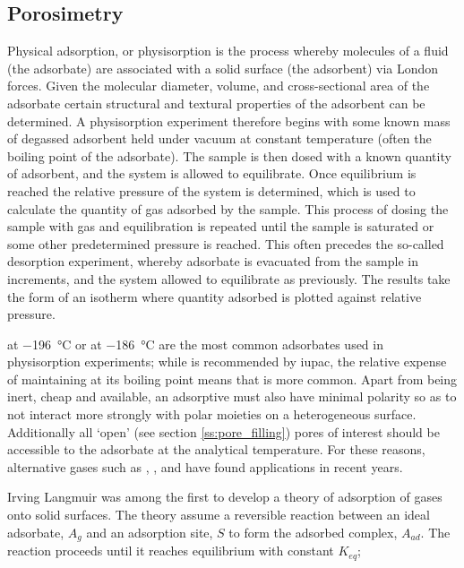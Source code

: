 \subsection{Porosimetry}\label{ss:porosimetry}

Physical \gls{adsorption}, or \gls{physisorption} is the process whereby molecules of a fluid (the \gls{adsorbate}) are associated with a solid surface (the \gls{adsorbent}) via London forces. Given the molecular diameter, volume, and cross-sectional area of the \gls{adsorbate} certain structural and textural properties of the \gls{adsorbent} can be determined.\citep{Brunauer1938Adsorption} A \gls{physisorption} experiment therefore begins with some known mass of degassed \gls{adsorbent} held under vacuum at constant temperature (often the boiling point of the \gls{adsorbate}). The sample is then dosed with a known quantity of \gls{adsorbent}, and the system is allowed to equilibrate. Once equilibrium is reached the relative pressure of the system is determined, which is used to calculate the quantity of gas adsorbed by the sample. This process of dosing the sample with gas and equilibration is repeated until the sample is saturated or some other predetermined pressure is reached. This often precedes the so-called desorption experiment, whereby \gls{adsorbate} is evacuated from the sample in increments, and the system allowed to equilibrate as previously. The results take the form of an isotherm where quantity adsorbed is plotted against
relative pressure.\citep{Brunauer1938Adsorption, Langmuir1916constitution, Thommes2015Physisorption}

 at \qty{-196}{\degreeCelsius} or  at \qty{-186}{\degreeCelsius} are the most common \glspl{adsorbate} used in \gls{physisorption} experiments; while  is recommended by \acrshort{iupac},\citep{Thommes2015Physisorption} the relative expense of maintaining  at its boiling point means that  is more common. Apart from being inert, cheap and available, an adsorptive must also have minimal polarity so as to not interact more strongly with polar moieties on a heterogeneous surface. Additionally all `open' (see section \ref{ss:pore_filling}) pores of interest should be accessible to the \gls{adsorbate} at the analytical temperature. For these reasons, alternative gases such as , , and  have found applications in recent years.\citep{Jagiello2019Enhanced, Blankenship2022Confirmation, Jagiello2008Characterization}

Irving Langmuir was among the first to develop a theory of \gls{adsorption} of gases onto solid surfaces. The theory assume a reversible reaction between an ideal \gls{adsorbate}, $A_g$ and an \gls{adsorption} site, $S$ to form the adsorbed complex, $A_{ad}$. The reaction proceeds until it reaches equilibrium with constant $K_{eq}$;


